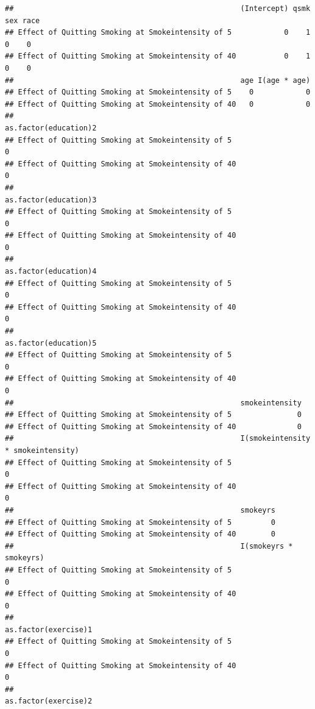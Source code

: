 \documentclass[
  10pt,
]{book}
\begin{document}
\begin{verbatim}
##                                                    (Intercept) qsmk sex race
## Effect of Quitting Smoking at Smokeintensity of 5            0    1   0    0
## Effect of Quitting Smoking at Smokeintensity of 40           0    1   0    0
##                                                    age I(age * age)
## Effect of Quitting Smoking at Smokeintensity of 5    0            0
## Effect of Quitting Smoking at Smokeintensity of 40   0            0
##                                                    as.factor(education)2
## Effect of Quitting Smoking at Smokeintensity of 5                      0
## Effect of Quitting Smoking at Smokeintensity of 40                     0
##                                                    as.factor(education)3
## Effect of Quitting Smoking at Smokeintensity of 5                      0
## Effect of Quitting Smoking at Smokeintensity of 40                     0
##                                                    as.factor(education)4
## Effect of Quitting Smoking at Smokeintensity of 5                      0
## Effect of Quitting Smoking at Smokeintensity of 40                     0
##                                                    as.factor(education)5
## Effect of Quitting Smoking at Smokeintensity of 5                      0
## Effect of Quitting Smoking at Smokeintensity of 40                     0
##                                                    smokeintensity
## Effect of Quitting Smoking at Smokeintensity of 5               0
## Effect of Quitting Smoking at Smokeintensity of 40              0
##                                                    I(smokeintensity * smokeintensity)
## Effect of Quitting Smoking at Smokeintensity of 5                                   0
## Effect of Quitting Smoking at Smokeintensity of 40                                  0
##                                                    smokeyrs
## Effect of Quitting Smoking at Smokeintensity of 5         0
## Effect of Quitting Smoking at Smokeintensity of 40        0
##                                                    I(smokeyrs * smokeyrs)
## Effect of Quitting Smoking at Smokeintensity of 5                       0
## Effect of Quitting Smoking at Smokeintensity of 40                      0
##                                                    as.factor(exercise)1
## Effect of Quitting Smoking at Smokeintensity of 5                     0
## Effect of Quitting Smoking at Smokeintensity of 40                    0
##                                                    as.factor(exercise)2

\end{verbatim}
\end{document}

